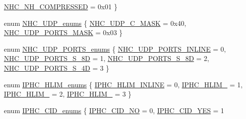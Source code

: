 \begin{DoxyCompactItemize}
\hyperlink{group___i_p_h_c_gga73bb223d863ae25ed213760b45417d8faa75f095ad129b92f9869d6d8c1571cb3}{N\+H\+C\+\_\+\+N\+H\+\_\+\+C\+O\+M\+P\+R\+E\+S\+S\+ED} = 0x01
 \}
\item 
enum \hyperlink{group___i_p_h_c_ga7afe46dd099effec3f504f29bb10c4fe}{N\+H\+C\+\_\+\+U\+D\+P\+\_\+enums} \{ \hyperlink{group___i_p_h_c_gga7afe46dd099effec3f504f29bb10c4fea4711e5b0ae521173d249943bb24717ca}{N\+H\+C\+\_\+\+U\+D\+P\+\_\+\+C\+\_\+\+M\+A\+SK} = 0x40, 
\hyperlink{group___i_p_h_c_gga7afe46dd099effec3f504f29bb10c4fea455c2dbb80da88e48b77a69348eebb19}{N\+H\+C\+\_\+\+U\+D\+P\+\_\+\+P\+O\+R\+T\+S\+\_\+\+M\+A\+SK} = 0x03
 \}
\item 
enum \hyperlink{group___i_p_h_c_ga2ccc80e9c7095920e9f24682b29933dd}{N\+H\+C\+\_\+\+U\+D\+P\+\_\+\+P\+O\+R\+T\+S\+\_\+enums} \{ \hyperlink{group___i_p_h_c_gga2ccc80e9c7095920e9f24682b29933ddac6189b2b203d79aa5c10b9a32f63af90}{N\+H\+C\+\_\+\+U\+D\+P\+\_\+\+P\+O\+R\+T\+S\+\_\+\+I\+N\+L\+I\+NE} = 0, 
\hyperlink{group___i_p_h_c_gga2ccc80e9c7095920e9f24682b29933ddab29a07ce6359ca61e907b8495927b57c}{N\+H\+C\+\_\+\+U\+D\+P\+\_\+\+P\+O\+R\+T\+S\+\_\+S\+\_\+8D} = 1, 
\hyperlink{group___i_p_h_c_gga2ccc80e9c7095920e9f24682b29933dda1f572e3350847dd34b396e37e300bde4}{N\+H\+C\+\_\+\+U\+D\+P\+\_\+\+P\+O\+R\+T\+S\+\_\+S\+\_\+8D} = 2, 
\hyperlink{group___i_p_h_c_gga2ccc80e9c7095920e9f24682b29933ddab3447deb5ed8e54d6bc352e3ede6ec4a}{N\+H\+C\+\_\+\+U\+D\+P\+\_\+\+P\+O\+R\+T\+S\+\_\+S\+\_\+4D} = 3
 \}
\item 
enum \hyperlink{group___i_p_h_c_ga189f4a88715e326fed26365ced5c4f92}{I\+P\+H\+C\+\_\+\+H\+L\+I\+M\+\_\+enums} \{ \hyperlink{group___i_p_h_c_gga189f4a88715e326fed26365ced5c4f92a5c12c89dad46a729f9b32d63508d96fe}{I\+P\+H\+C\+\_\+\+H\+L\+I\+M\+\_\+\+I\+N\+L\+I\+NE} = 0, 
\hyperlink{group___i_p_h_c_gga189f4a88715e326fed26365ced5c4f92ae141dec6b14fb4a6bc8fdcf6893cfa2d}{I\+P\+H\+C\+\_\+\+H\+L\+I\+M\+\_} = 1, 
\hyperlink{group___i_p_h_c_gga189f4a88715e326fed26365ced5c4f92a5f6b02f479096bef700764db225b8d26}{I\+P\+H\+C\+\_\+\+H\+L\+I\+M\+\_} = 2, 
\hyperlink{group___i_p_h_c_gga189f4a88715e326fed26365ced5c4f92a9d7d373c07a2a140034b1ae398fefd3d}{I\+P\+H\+C\+\_\+\+H\+L\+I\+M\+\_} = 3
 \}
\item 
enum \hyperlink{group___i_p_h_c_ga751893c0bdb02d7faeb6f52e1bca836f}{I\+P\+H\+C\+\_\+\+C\+I\+D\+\_\+enums} \{ \hyperlink{group___i_p_h_c_gga751893c0bdb02d7faeb6f52e1bca836fa8ae61ca6d607248cc784a62543f97a3e}{I\+P\+H\+C\+\_\+\+C\+I\+D\+\_\+\+NO} = 0, 
\hyperlink{group___i_p_h_c_gga751893c0bdb02d7faeb6f52e1bca836fa3d47c848bcd3cb469b40e3c9ea5c83d5}{I\+P\+H\+C\+\_\+\+C\+I\+D\+\_\+\+Y\+ES} = 1

\end{DoxyCompactItemize}
